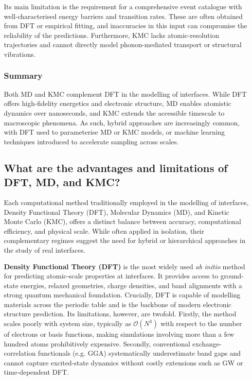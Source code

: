 Its main limitation is the requirement for a comprehensive event catalogue with well-characterised energy barriers and transition rates. These are often obtained from DFT or empirical fitting, and inaccuracies in this input can compromise the reliability of the predictions. Furthermore, KMC lacks atomic-resolution trajectories and cannot directly model phonon-mediated transport or structural vibrations.

\subsubsection{Summary}

Both MD and KMC complement DFT in the modelling of interfaces. While DFT offers high-fidelity energetics and electronic structure, MD enables atomistic dynamics over nanoseconds, and KMC extends the accessible timescale to macroscopic phenomena. As such, hybrid approaches are increasingly common, with DFT used to parameterise MD or KMC models, or machine learning techniques introduced to accelerate sampling across scales.

\subsection{What are the advantages and limitations of DFT, MD, and KMC?}

Each computational method traditionally employed in the modelling of interfaces, Density Functional Theory (DFT), Molecular Dynamics (MD), and Kinetic Monte Carlo (KMC), offers a distinct balance between accuracy, computational efficiency, and physical scale. While often applied in isolation, their complementary regimes suggest the need for hybrid or hierarchical approaches in the study of real interfaces.

\textbf{Density Functional Theory (DFT)} is the most widely used \textit{ab initio} method for predicting atomic-scale properties at interfaces. It provides access to ground-state energies, relaxed geometries, charge densities, and band alignments with a strong quantum mechanical foundation. Crucially, DFT is capable of modelling materials across the periodic table and is the backbone of modern electronic structure prediction. Its limitations, however, are twofold. Firstly, the method scales poorly with system size, typically as $\mathcal{O}(N^3)$ with respect to the number of electrons or basis functions, making simulations involving more than a few hundred atoms prohibitively expensive. Secondly, conventional exchange-correlation functionals (e.g. GGA) systematically underestimate band gaps and cannot capture excited-state dynamics without costly extensions such as GW or time-dependent DFT.

